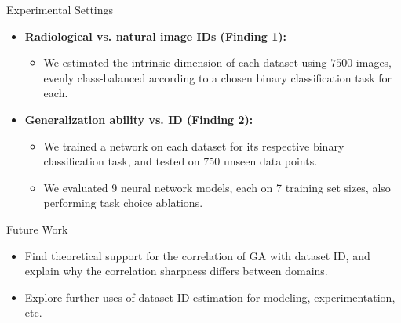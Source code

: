 \documentclass[final,hyperref={pdfpagelabels=false}]{beamer}
\begin{document}
\begin{frame}[t]
\begin{columns}[t]
\begin{column}{.47\textwidth}
\begin{block}{Experimental Settings}
    \begin{itemize}
        \item \textbf{Radiological vs. natural image IDs (Finding 1):}
        \begin{itemize}
            \item We estimated the intrinsic dimension of each dataset using $7500$ images, evenly class-balanced according to a chosen binary classification task for each.
        \end{itemize}

        \item \textbf{Generalization ability vs. ID (Finding 2):}
        \begin{itemize}
        \item We trained a network on each dataset for its respective binary classification task, and tested on 750 unseen data points.
        \item We evaluated 9 neural network models, each on 7 training set sizes, also performing task choice ablations.
        \end{itemize}
    \end{itemize}

\end{block}

\begin{block}{Future Work}

\begin{itemize}
\item Find theoretical support for the correlation of GA with dataset ID, and explain why the correlation sharpness differs between domains.
\item Explore further uses of dataset ID estimation for modeling, experimentation, etc.
\end{itemize}


\end{block}
\end{column}
\end{columns}
\end{frame}
\end{document}
